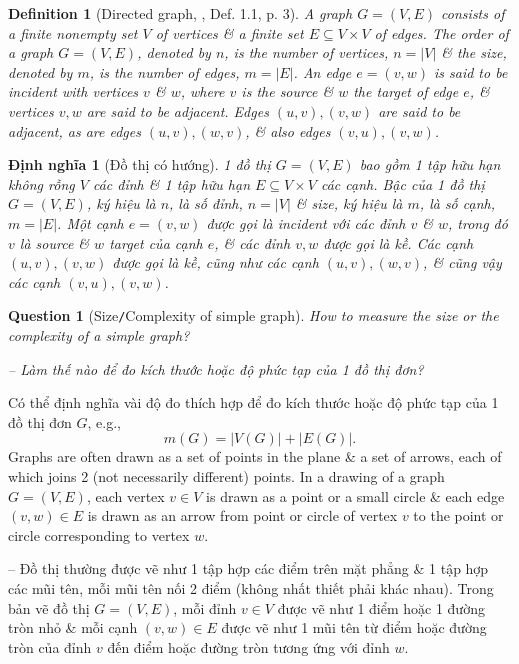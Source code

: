 \documentclass[oneside]{book}
\newtheorem{definition}{Definition}
\newtheorem{dinhnghia}{Định nghĩa}
\newtheorem{question}{Question}
\begin{document}
\begin{definition}[Directed graph, \cite{Valiente2021}, Def. 1.1, p. 3]
	A {\rm graph} $G = (V,E)$ consists of a finite nonempty set $V$ of vertices \& a finite set $E\subseteq V\times V$ of edges. The {\rm order} of a graph $G = (V,E)$, denoted by $n$, is the number of vertices, $n = |V|$ \& the {\rm size}, denoted by $m$, is the number of edges, $m = |E|$. An edge $e = (v,w)$ is said to be {\rm incident} with vertices $v$ \& $w$, where $v$ is the {\rm source} \& $w$ the {\rm target} of edge $e$, \& vertices $v,w$ are said to be {\rm adjacent}. Edges $(u,v),(v,w)$ are said to be {\rm adjacent}, as are edges $(u,v),(w,v)$, \& also edges $(v,u),(v,w)$.
\end{definition}

\begin{dinhnghia}[Đồ thị có hướng]
	1 {\rm đồ thị} $G = (V,E)$ bao gồm 1 tập hữu hạn không rỗng $V$ các đỉnh \& 1 tập hữu hạn $E\subseteq V\times V$ các cạnh. {\rm Bậc} của 1 đồ thị $G = (V,E)$, ký hiệu là $n$, là số đỉnh, $n = |V|$ \& {\rm size}, ký hiệu là $m$, là số cạnh, $m = |E|$. Một cạnh $e = (v,w)$ được gọi là {\rm incident} với các đỉnh $v$ \& $w$, trong đó $v$ là {\rm source} \& $w$ {\rm target} của cạnh $e$, \& các đỉnh $v,w$ được gọi là {\rm kề}. Các cạnh $(u,v),(v,w)$ được gọi là {\rm kề}, cũng như các cạnh $(u,v),(w,v)$, \& cũng vậy các cạnh $(v,u),(v,w)$.
\end{dinhnghia}

\begin{question}[Size{\tt/}Complexity of simple graph]
	How to measure the size or the complexity of a simple graph?
	
	-- Làm thế nào để đo kích thước hoặc độ phức tạp của 1 đồ thị đơn?
\end{question}
Có thể định nghĩa vài độ đo thích hợp để đo kích thước hoặc độ phức tạp của 1 đồ thị đơn $G$, e.g.,
\begin{equation*}
	m(G) = |V(G)| + |E(G)|.
\end{equation*}
Graphs are often drawn as a set of points in the plane \& a set of arrows, each of which joins 2 (not necessarily different) points. In a drawing of a graph $G = (V,E)$, each vertex $v\in V$ is drawn as a point or a small circle \& each edge $(v,w)\in E$ is drawn as an arrow from point or circle of vertex $v$ to the point or circle corresponding to vertex $w$.

-- Đồ thị thường được vẽ như 1 tập hợp các điểm trên mặt phẳng \& 1 tập hợp các mũi tên, mỗi mũi tên nối 2 điểm (không nhất thiết phải khác nhau). Trong bản vẽ đồ thị $G = (V,E)$, mỗi đỉnh $v\in V$ được vẽ như 1 điểm hoặc 1 đường tròn nhỏ \& mỗi cạnh $(v,w)\in E$ được vẽ như 1 mũi tên từ điểm hoặc đường tròn của đỉnh $v$ đến điểm hoặc đường tròn tương ứng với đỉnh $w$.
\end{document}

